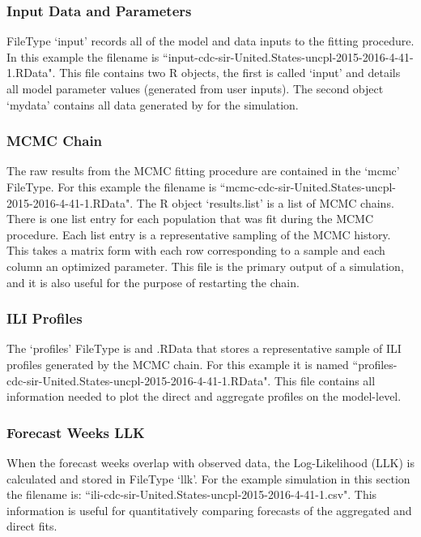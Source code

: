 \documentclass[a4paper]{article}
\begin{document}
\subsubsection{Input Data and Parameters}
FileType `input' records all of the model and data inputs to the fitting procedure.  In this example the filename is ``input-cdc-sir-United.States-uncpl-2015-2016-4-41-1.RData".  This file contains two R objects, the first is called `input' and details all model parameter values (generated from user inputs).  The second object `mydata' contains all data generated by  for the simulation.

\subsubsection{MCMC Chain}
The raw results from the MCMC fitting procedure are contained in the `mcmc' FileType.  For this example the filename is ``mcmc-cdc-sir-United.States-uncpl-2015-2016-4-41-1.RData".  The R object `results.list' is a list of MCMC chains.  There is one list entry for each population that was fit during the MCMC procedure.  Each list entry is a representative sampling of the MCMC history.  This takes a matrix form with each row corresponding to a sample and each column an optimized parameter.  This file is the primary output of a simulation, and it is also useful for the purpose of restarting the chain.

\subsubsection{ILI Profiles}
The `profiles' FileType is and .RData that stores a representative sample of ILI profiles generated by the MCMC chain.  For this example it is named ``profiles-cdc-sir-United.States-uncpl-2015-2016-4-41-1.RData".  This file contains all information needed to plot the direct and aggregate profiles on the model-level.

\subsubsection{Forecast Weeks LLK}
When the forecast weeks overlap with observed data, the Log-Likelihood (LLK) is calculated and stored in FileType `llk'.  For the example simulation in this section the filename is: ``ili-cdc-sir-United.States-uncpl-2015-2016-4-41-1.csv".  This information is useful for quantitatively comparing forecasts of the aggregated and direct fits.
\end{document}
